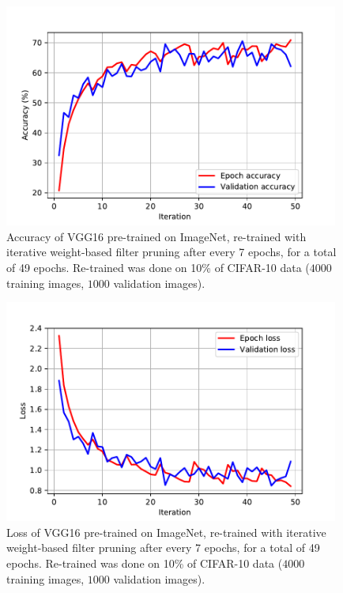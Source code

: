 \documentclass{article}
\begin{document}
\begin{figure}[!t]
	\centering
	\includegraphics[width=11cm]{./results/pPruneWeightNoNorm5_pre_out_7_in_7_cifar10_10percent_acc.pdf}
	\caption{Accuracy of VGG16 pre-trained on ImageNet, re-trained with iterative weight-based filter pruning after every 7 epochs, for a total of 49 epochs. Re-trained was done on 10\% of CIFAR-10 data ($4000$ training images, $1000$ validation images).}
\end{figure}

\begin{figure}[!t]
	\centering
	\includegraphics[width=11cm]{./results/pPruneWeightNoNorm5_pre_out_7_in_7_cifar10_10percent_loss.pdf}
	\caption{Loss of VGG16 pre-trained on ImageNet, re-trained with iterative weight-based filter pruning after every 7 epochs, for a total of 49 epochs. Re-trained was done on 10\% of CIFAR-10 data ($4000$ training images, $1000$ validation images).}
\end{figure}


\ \\ 
\ \\
\ \\
\end{document}
